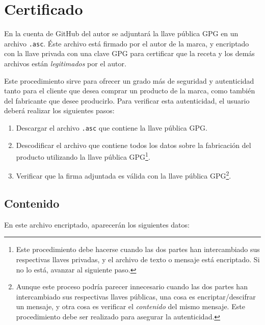 \documentclass[12pt,a4paper]{article}
\begin{document}
\section{Certificado}
En la cuenta de GitHub del autor se adjuntará la llave pública GPG en un archivo \texttt{.asc}. Éste archivo está firmado por el autor de la marca, y encriptado con la llave privada con una clave GPG para certificar que la receta y los demás archivos están \textit{legitimados} por el autor.

Este procedimiento sirve para ofrecer un grado más de seguridad y autenticidad tanto para el cliente que desea comprar un producto de la marca, como también del fabricante que desee producirlo. Para verificar esta autenticidad, el usuario deberá realizar los siguientes pasos:

\begin{enumerate}
\item Descargar el archivo \texttt{.asc} que contiene la llave pública GPG.
\item Descodificar el archivo que contiene todos los datos sobre la fabricación del producto utilizando la llave pública GPG\footnote{Este procedimiento debe hacerse cuando las dos partes han intercambiado sus respectivas llaves privadas, y el archivo de texto o mensaje está encriptado. Si no lo está, avanzar al siguiente paso.}.
\item Verificar que la firma adjuntada es válida con la llave pública GPG\footnote{Aunque este proceso podría parecer innecesario cuando las dos partes han intercambiado sus respectivas llaves públicas, una cosa es encriptar/descifrar un mensaje, y otra cosa es verificar el \textit{contenido} del mismo mensaje. Este procedimiento debe ser realizado para asegurar la autenticidad.}.
\end{enumerate}

\subsection{Contenido}
En este archivo encriptado, aparecerán los siguientes datos:
\end{document}
